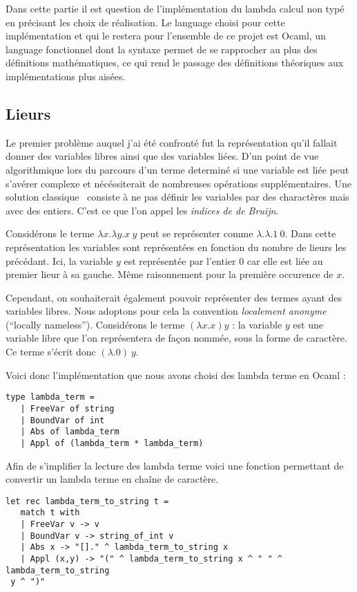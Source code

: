 \documentclass{article}
\theoremstyle{definition}
\theoremstyle{remark}
\begin{document}
Dans cette partie il est question de l'implémentation du lambda calcul
non typé en précisant les choix de réalisation.  Le language choisi
pour cette implémentation et qui le restera pour l'ensemble de ce
projet est Ocaml, un language fonctionnel dont la syntaxe permet de se
rapprocher au plus des définitions mathématiques, ce qui rend le
passage des définitions théoriques aux implémentations plus aisées.


\subsection{Lieurs}

Le premier problème auquel j'ai été confronté fut la représentation
qu'il fallait donner des variables libres ainsi que des variables
liées.  D'un point de vue algorithmique lors du parcours d'un terme
determiné si une variable est liée peut s'avérer complexe et
nécéssiterait de nombreuses opérations supplémentaires.  Une solution
classique~\citep{pierce:tapl} consiste à ne pas définir les variables
par des charactères mais avec des entiers. C'est ce que l'on appel les
\emph{indices de de Bruijn}.

Considérons le terme \(\lambda x. \lambda y. x\: y\) peut se
représenter comme \(\lambda. \lambda. 1\: 0\).  Dans cette
représentation les variables sont représentées en fonction du nombre
de lieurs les précédant.  Ici, la variable \(y\) est représentée par
l'entier 0 car elle est liée au premier lieur à sa gauche. Même
raisonnement pour la première occurence de \(x\).

Cependant, on souhaiterait également pouvoir représenter des termes
ayant des variables libres. Nous adoptons pour cela la convention
\emph{localement
  anonyme}~\citep{mcbride:not-a-variable,chargueraud:locally-nameless}
(``locally nameless''). Considérons le terme \((\lambda x. x) y\) : la
variable \(y\) est une variable libre que l'on représentera de façon
nommée, sous la forme de caractère. Ce terme s'écrit donc
\((\lambda. 0)\: y\).

Voici donc l'implémentation que nous avons choisi des lambda terme en Ocaml :
%
\begin{verbatim}
type lambda_term =   
   | FreeVar of string    
   | BoundVar of int    
   | Abs of lambda_term   
   | Appl of (lambda_term * lambda_term)
\end{verbatim}

Afin de s'implifier la lecture des lambda terme voici une fonction permettant
 de convertir un lambda terme en chaîne de caractère.
%
\begin{verbatim}
let rec lambda_term_to_string t = 
   match t with 
   | FreeVar v -> v 
   | BoundVar v -> string_of_int v 
   | Abs x -> "[]." ^ lambda_term_to_string x 
   | Appl (x,y) -> "(" ^ lambda_term_to_string x ^ " " ^ lambda_term_to_string
 y ^ ")"
\end{verbatim}
\end{document}
